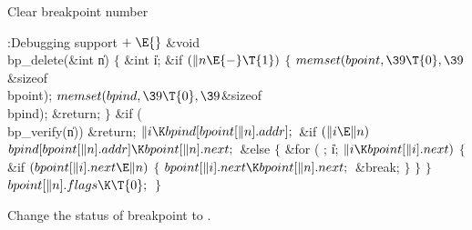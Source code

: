 Clear breakpoint number 

\Y\B\4:Debugging support\X${}\mathrel+\E{}$\6
\&{void} \\{bp\_delete}(\&{int} \|n)\1\1\2\2\6
${}\{{}$\1\6
\&{int} \|i;\7
\&{if} ${}(\|n\E{-}\T{1}){}$\5
${}\{{}$\1\6
${}\\{memset}(\\{bpoint},\39\T{0},\39{}$\&{sizeof} \\{bpoint});\6
${}\\{memset}(\\{bpind},\39\T{0},\39{}$\&{sizeof} \\{bpind});\6
\&{return};\6
\4${}\}{}$\2\6
\&{if} (\\{bp\_verify}(\|n))\1\5
\&{return};\2\6
${}\|i\K\\{bpind}[\\{bpoint}[\|n].\\{addr}];{}$\6
\&{if} ${}(\|i\E\|n){}$\1\5
${}\\{bpind}[\\{bpoint}[\|n].\\{addr}]\K\\{bpoint}[\|n].\\{next};{}$\2\6
\&{else}\5
${}\{{}$\1\6
\&{for} ( ; \|i; ${}\|i\K\\{bpoint}[\|i].\\{next}){}$\5
${}\{{}$\1\6
\&{if} ${}(\\{bpoint}[\|i].\\{next}\E\|n){}$\5
${}\{{}$\1\6
${}\\{bpoint}[\|i].\\{next}\K\\{bpoint}[\|n].\\{next};{}$\6
\&{break};\6
\4${}\}{}$\2\6
\4${}\}{}$\2\6
\4${}\}{}$\2\6
${}\\{bpoint}[\|n].\\{flags}\K\T{0};{}$\6
\4${}\}{}$\2\par
\fi

Change the status of breakpoint  to .

